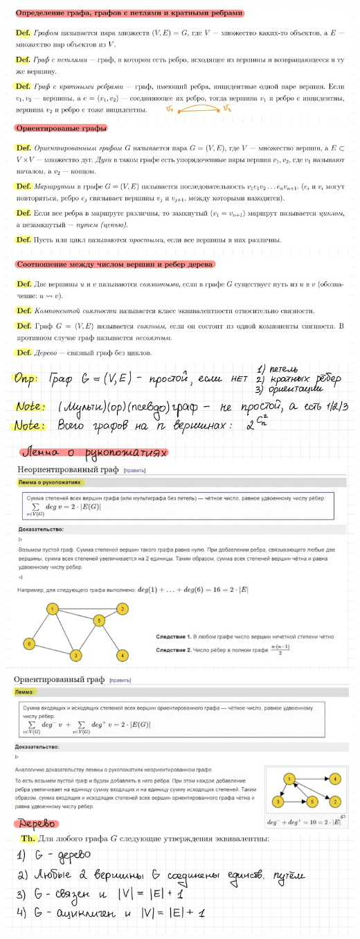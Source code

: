 \includegraphics[width=1\linewidth]{sections/Polina/imgs/1.jpg}
\newpage \includegraphics[width=1\linewidth]{sections/Polina/imgs/2.jpg}
